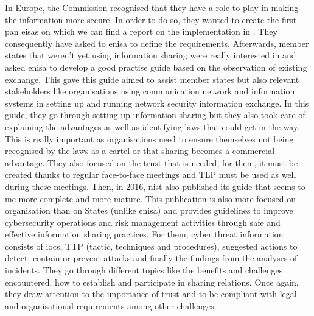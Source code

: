 \documentclass{eplmastersthesis}
\begin{document}
In Europe, the Commission recognised that they have a role to play in making the information more secure. In order to do so, they wanted to create the first pan \gls{eisas} on which we can find a report on the implementation in \cite{eisasRapport}.  They consequently have asked to \gls{enisa} to define the requirements. Afterwards, member states that weren't yet using information sharing were really interested in and asked \gls{enisa} to develop a good practise guide based on the observation of existing exchange. This gave this guide \cite{enisaguide2009} aimed to assist member states but also relevant stakeholders like organisations using communication network and information systems in setting up and running network security information exchange.
In this guide, they go through setting up information sharing but they also took care of explaining the advantages as well as identifying laws that could get in the way. This is really important as organisations need to ensure themselves not being recognised by the laws as a cartel or that sharing becomes a commercial advantage. They also focused on the trust that is needed, for them, it must be created thanks to regular face-to-face meetings and TLP must be used as well during these meetings.
Then, in 2016, \gls{nist} also published its guide \cite{johnson2014guide} that seems to me more complete and more mature. This publication is also more focused on organisation than on States (unlike \gls{enisa}) and provides guidelines to improve cybersecurity operations and risk management activities through safe and effective information sharing practices.
For them, cyber threat information consists of \glspl{ioc}, TTP (tactic, techniques and procedures), suggested actions to detect, contain or prevent attacks and finally the findings from the analyses of incidents. 
They go through different topics like the benefits and challenges encountered, how to establish and participate in sharing relations. Once again, they draw attention to the importance of trust and to be compliant with legal and organisational requirements among other challenges.\\
\end{document}
